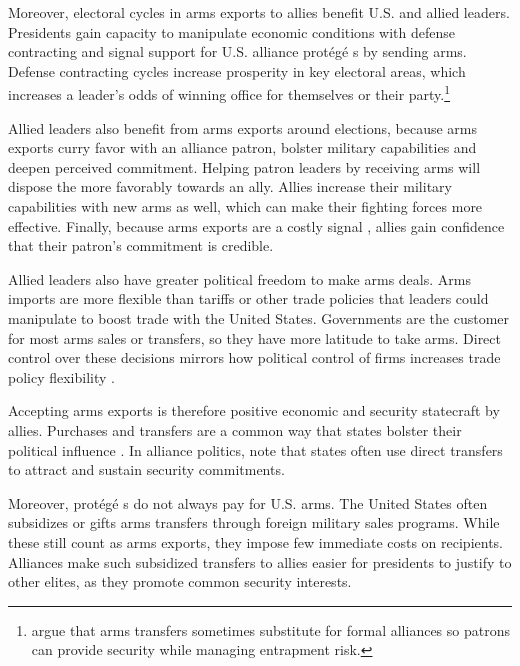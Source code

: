 \documentclass[12pt]{article}
\begin{document}
Moreover, electoral cycles in arms exports to allies benefit U.S. and allied leaders.
Presidents gain capacity to manipulate economic conditions with defense contracting and signal support for U.S. alliance prot{\'e}g{\'e} s by sending arms.
Defense contracting cycles increase prosperity in key electoral areas, which increases a leader's odds of winning office for themselves or their party.\footnote{\citet{Yarhi-Miloetal2016} argue that arms transfers sometimes substitute for formal alliances so patrons can provide security while managing entrapment risk.}

Allied leaders also benefit from arms exports around elections, because arms exports curry favor with an alliance patron, bolster military capabilities and deepen perceived commitment.
Helping patron leaders by receiving arms will dispose the more favorably towards an ally. 
Allies increase their military capabilities with new arms as well, which can make their fighting forces more effective. 
Finally, because arms exports are a costly signal \citep{McManusYarhi-Milo2017}, allies gain confidence that their patron's commitment is credible. 


Allied leaders also have greater political freedom to make arms deals.
Arms imports are more flexible than tariffs or other trade policies that leaders could manipulate to boost trade with the United States.
Governments are the customer for most arms sales or transfers, so they have more latitude to take arms.
Direct control over these decisions mirrors how political control of firms increases trade policy flexibility \citep{Davisetal2019}.


Accepting arms exports is therefore positive economic and security statecraft by allies. 
Purchases and transfers are a common way that states bolster their political influence \citep[pg. 42-3]{Baldwin2020}.
In alliance politics, \citet[pg. 184-5]{IkenberryGrieco2003} note that states often use direct transfers to attract and sustain security commitments.  

Moreover, prot{\'e}g{\'e} s do not always pay for U.S. arms.
The United States often subsidizes or gifts arms transfers through foreign military sales programs. 
While these still count as arms exports, they impose few immediate costs on recipients.
Alliances make such subsidized transfers to allies easier for presidents to justify to other elites, as they promote common security interests. 
\end{document}
